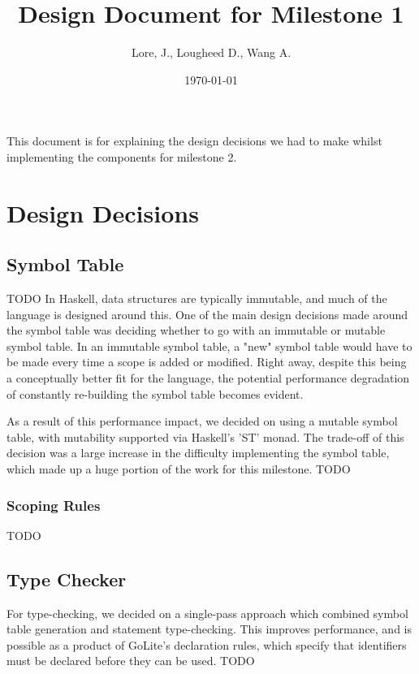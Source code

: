\documentclass[11pt]{article}
\author{Lore, J., Lougheed D., Wang A.}
\date{\today}
\title{Design Document for Milestone 1}
\begin{document}
\maketitle
\tableofcontents

This document is for explaining the design decisions we had to make
whilst implementing the components for milestone 2.
\newpage
\section{Design Decisions}
\label{sec:org3150b70}
\subsection{Symbol Table}
\label{sec:org1b803b0}
TODO
In Haskell, data structures are typically immutable, and much of the language
is designed around this. One of the main design decisions made around the symbol
table was deciding whether to go with an immutable or mutable symbol table. In
an immutable symbol table, a "new" symbol table would have to be made every time
a scope is added or modified. Right away, despite this being a conceptually
better fit for the language, the potential performance degradation of constantly
re-building the symbol table becomes evident.

As a result of this performance impact, we decided on using a mutable symbol
table, with mutability supported via Haskell's 'ST' monad. The trade-off of
this decision was a large increase in the difficulty implementing the symbol
table, which made up a huge portion of the work for this milestone.
TODO
\subsubsection{Scoping Rules}
\label{sec:orgaa742cb}
TODO
\subsection{Type Checker}
\label{sec:org0373b21}
For type-checking, we decided on a single-pass approach which combined symbol
table generation and statement type-checking. This improves performance, and is
possible as a product of GoLite's declaration rules, which specify that
identifiers must be declared before they can be used.
TODO
\end{document}
